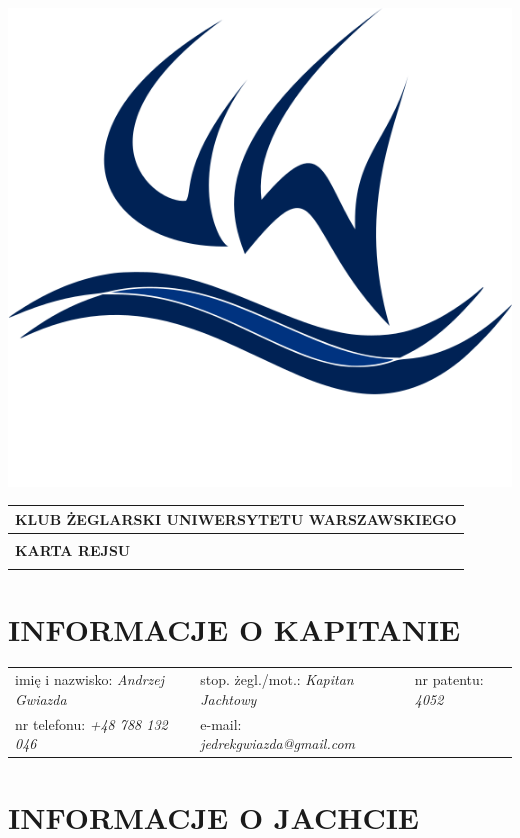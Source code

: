 \documentclass{article}
\author{Andrzej Gwiazda}
\begin{document}
\newpage
\begin{minipage}{0.11\textwidth}
\includegraphics[width=\textwidth]{logo.png}
\end{minipage}
\begin{minipage}{0.89\textwidth}
\begin{tabularx}{\textwidth} { 
  | >{\centering\arraybackslash}X | }
 \hline
 \textbf{KLUB ŻEGLARSKI UNIWERSYTETU WARSZAWSKIEGO} \\
 \hline
 \\
 \textbf{\huge KARTA REJSU} \\
 \\
\hline
\end{tabularx}
\end{minipage}

\section*{INFORMACJE O KAPITANIE}
\begin{tabularx}{\textwidth}{X X X}
imię i nazwisko: \textit{Andrzej Gwiazda} & stop. żegl./mot.: \textit{Kapitan Jachtowy} & nr patentu: \textit{4052} \\
nr telefonu: \textit{+48 788 132 046} & e-mail: \textit{jedrekgwiazda@gmail.com} \\
\end{tabularx}

\section*{INFORMACJE O JACHCIE}
\end{document}
